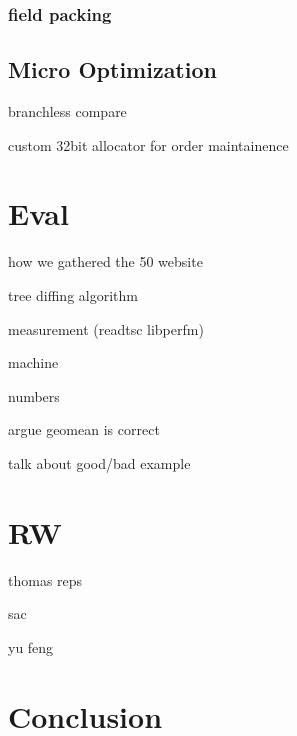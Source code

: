 \documentclass[format=acmsmall, review=false, screen=true]{acmart}
\begin{document}
\subsubsection{field packing}
\subsection{Micro Optimization}
branchless compare

custom 32bit allocator for order maintainence

\section{Eval}
how we gathered the 50 website

tree diffing algorithm

measurement (readtsc libperfm)

machine

numbers

argue geomean is correct

talk about good/bad example
\section{RW}
thomas reps

sac

yu feng
\section{Conclusion}
\end{document}
